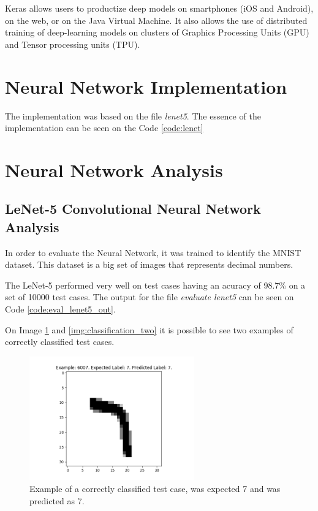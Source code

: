 \documentclass[journal]{IEEEtran}
\begin{document}
Keras allows users to productize deep models on smartphones (iOS and Android), on the web, or on the Java Virtual Machine. It also allows the use of distributed training of deep-learning models on clusters of Graphics Processing Units (GPU) and Tensor processing units (TPU).

\section{Neural Network Implementation}

The implementation was based on the file \textit{lenet5}. The essence of the implementation can be seen on the Code \ref{code:lenet}



\section{Neural Network Analysis}

\subsection{LeNet-5 Convolutional Neural Network Analysis}

In order to evaluate the Neural Network, it was trained to identify the MNIST dataset. This dataset is a big set of images that represents decimal numbers.

The LeNet-5 performed very well on test cases having an acuracy of 98.7\% on a set of 10000 test cases. The output for the file \textit{evaluate lenet5} can be seen on Code \ref{code:eval_lenet5_out}.

On Image \ref{img:classification_one} and \ref{img:classification_two} it is possible to see two examples of correctly classified test cases.

\begin{figure}
  \begin{center}
  \includegraphics[width=2.8in]{./../code/test_image_6007.png}
  \caption{Example of a correctly classified test case, was expected 7 and was predicted as 7.}
  \label{img:classification_one}
  \end{center}
\end{figure}
\end{document}
